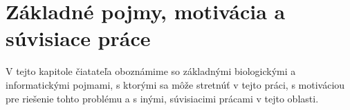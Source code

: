 \chapter{Základné pojmy, motivácia a súvisiace práce}

V tejto kapitole čiatateľa oboznámime so základnými biologickými
a informatickými pojmami, s ktorými sa môže stretnúť v tejto práci, s motiváciou
pre riešenie tohto problému a s inými, súvisiacimi prácami v tejto oblasti.

